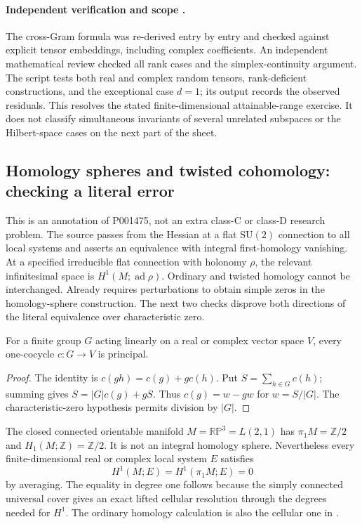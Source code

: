 \paragraph{Independent verification and scope \oursComputed.}
The cross-Gram formula was re-derived entry by entry and checked
against explicit tensor embeddings, including complex coefficients.
An independent mathematical review checked all rank cases and the
simplex-continuity argument. The script
 tests both real and complex
random tensors, rank-deficient constructions, and the exceptional
case \(d=1\); its output records the observed residuals.
This resolves the stated finite-dimensional attainable-range exercise.
It does not classify simultaneous invariants of several unrelated
subspaces or the Hilbert-space cases on the next part of the sheet.

\subsection{Homology spheres and twisted cohomology: checking a literal error}
\label{dev:twisted-h1}

This is an annotation of P001475, not an extra class-C or class-D
research problem. The source passes from the Hessian at a flat
\(\mathrm{SU}(2)\) connection to all local systems and asserts an
equivalence with integral first-homology vanishing.
At a specified irreducible flat connection with holonomy \(\rho\),
the relevant infinitesimal space is \(H^1(M;\operatorname{ad}\rho)\).
Ordinary and twisted homology cannot be interchanged.
Already \citet[p.~287]{atiyah1988invariants} requires perturbations
to obtain simple zeros in the homology-sphere construction.
The next two checks disprove both directions of the literal
equivalence over characteristic zero.

\begin{lemma}
For a finite group \(G\) acting linearly on a real or complex vector
space \(V\), every one-cocycle \(c:G\to V\) is principal.
\end{lemma}
\begin{proof}
The identity is \(c(gh)=c(g)+g c(h)\).
Put \(S=\sum_{h\in G}c(h)\); summing gives
\(S=|G|c(g)+gS\). Thus \(c(g)=w-gw\) for \(w=S/|G|\).
The characteristic-zero hypothesis permits division by \(|G|\).
\end{proof}

\begin{example}
The closed connected orientable manifold \(M=\mathbb{RP}^3=L(2,1)\)
has \(\pi_1M=\mathbb Z/2\) and \(H_1(M;\mathbb Z)=\mathbb Z/2\).
It is not an integral homology sphere. Nevertheless every
finite-dimensional real or complex local system \(E\) satisfies
\[
 H^1(M;E)=H^1(\pi_1M;E)=0
\]
by averaging. The equality in degree one follows because the simply
connected universal cover gives an exact lifted cellular resolution
through the degrees needed for \(H^1\).
The ordinary homology calculation is also the cellular one in
\citet[Examples~2.42--2.43]{hatcher2002algebraic}.
\end{example}

